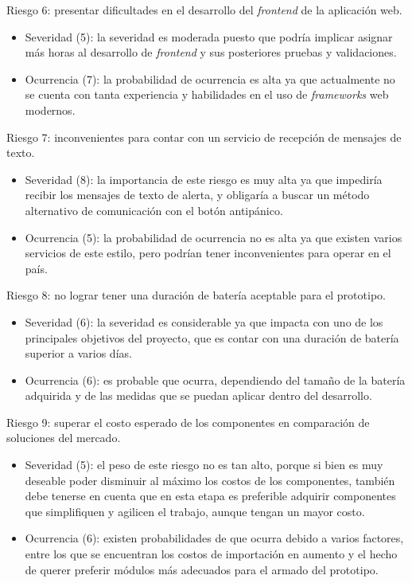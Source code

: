 \documentclass[
11pt, %
]{charter}
\begin{document}
Riesgo 6: presentar dificultades en el desarrollo del \textit{frontend} de la aplicación web.
\begin{itemize}
	\item Severidad (5): la severidad es moderada puesto que podría implicar asignar más horas al desarrollo de \textit{frontend} y sus posteriores pruebas y validaciones.
	\item Ocurrencia (7): la probabilidad de ocurrencia es alta ya que actualmente no se cuenta con tanta experiencia y habilidades en el uso de \textit{frameworks} web modernos.
\end{itemize}

Riesgo 7: inconvenientes para contar con un servicio de recepción de mensajes de texto.
\begin{itemize}
	\item Severidad (8): la importancia de este riesgo es muy alta ya que impediría recibir los mensajes de texto de alerta, y obligaría a buscar un método alternativo de comunicación con el botón antipánico.
	\item Ocurrencia (5): la probabilidad de ocurrencia no es alta ya que existen varios servicios de este estilo, pero podrían tener inconvenientes para operar en el país.
\end{itemize}

Riesgo 8: no lograr tener una duración de batería aceptable para el prototipo.
\begin{itemize}
	\item Severidad (6): la severidad es considerable ya que impacta con uno de los principales objetivos del proyecto, que es contar con una duración de batería superior a varios días.
	\item Ocurrencia (6): es probable que ocurra, dependiendo del tamaño de la batería adquirida y de las medidas que se puedan aplicar dentro del desarrollo.
\end{itemize}

Riesgo 9: superar el costo esperado de los componentes en comparación de soluciones del mercado.
\begin{itemize}
	\item Severidad (5): el peso de este riesgo no es tan alto, porque si bien es muy deseable poder disminuir al máximo los costos de los componentes, también debe tenerse en cuenta que en esta etapa es preferible adquirir componentes que simplifiquen y agilicen el trabajo, aunque tengan un mayor costo.
	\item Ocurrencia (6): existen probabilidades de que ocurra debido a varios factores, entre los que se encuentran los costos de importación en aumento y el hecho de querer preferir módulos más adecuados para el armado del prototipo.
\end{itemize}
\end{document}
